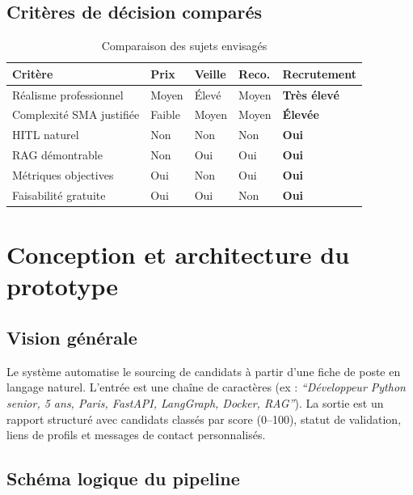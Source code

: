 \documentclass[12pt,a4paper]{report}
\begin{document}
\section{Critères de décision comparés}

\begin{table}[H]
\centering
\caption{Comparaison des sujets envisagés}
\label{tab:sujets}
\begin{tabularx}{\textwidth}{L{3.5cm}C{2cm}C{2cm}C{2cm}C{2cm}}
\toprule
\textbf{Critère} & \textbf{Prix} & \textbf{Veille} & \textbf{Reco.} & \textbf{Recrutement} \\
\midrule
Réalisme professionnel & Moyen & Élevé & Moyen & \textbf{Très élevé} \\
Complexité SMA justifiée & Faible & Moyen & Moyen & \textbf{Élevée} \\
HITL naturel & Non & Non & Non & \textbf{Oui} \\
RAG démontrable & Non & Oui & Oui & \textbf{Oui} \\
Métriques objectives & Oui & Non & Oui & \textbf{Oui} \\
Faisabilité gratuite & Oui & Oui & Non & \textbf{Oui} \\
\bottomrule
\end{tabularx}
\end{table}

\chapter{Conception et architecture du prototype}
\label{chap:conception}

\section{Vision générale}

Le système automatise le sourcing de candidats à partir d'une fiche de poste en
langage naturel. L'entrée est une chaîne de caractères (ex : \textit{``Développeur
Python senior, 5 ans, Paris, FastAPI, LangGraph, Docker, RAG''}). La sortie est un
rapport structuré avec candidats classés par score (0--100), statut de validation,
liens de profils et messages de contact personnalisés.

\section{Schéma logique du pipeline}
\end{document}
